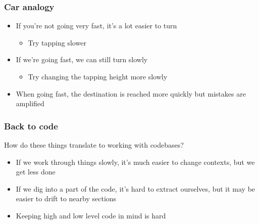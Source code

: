 \documentclass{beamer}
\begin{document}
\begin{frame}
\frametitle{Car analogy}
  \begin{itemize}
    \item If you're not going very fast, it's a lot easier to turn
    \begin{itemize}
      \item Try tapping slower
    \end{itemize}
    \item If we're going fast, we can still turn slowly
    \begin{itemize}
      \item Try changing the tapping height more slowly
    \end{itemize}
    \item When going fast, the destination is reached more quickly but mistakes are amplified
  \end{itemize}
\end{frame}


\begin{frame}
\frametitle{Back to code}
  How do these things translate to working with codebases?
  \begin{itemize}
    \item If we work through things slowly, it's much easier to change contexts, but we get less done
    \item If we dig into a part of the code, it's hard to extract ourselves, but it may be easier to drift to nearby sections
    \item Keeping high and low level code in mind is hard
  \end{itemize}
\end{frame}
\end{document}
